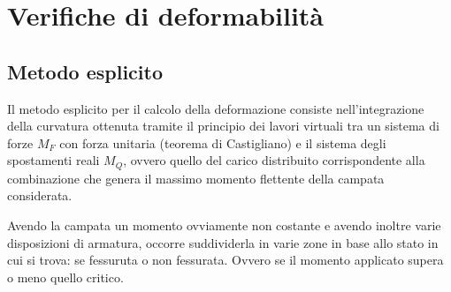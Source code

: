 \section{Verifiche di deformabilità}

\subsection{Metodo esplicito}
Il metodo esplicito per il calcolo della deformazione consiste nell'integrazione della curvatura ottenuta tramite il principio dei lavori virtuali tra un sistema di forze $M_F$ con forza unitaria (teorema di Castigliano) e il sistema degli spostamenti reali $M_Q$, ovvero quello del carico distribuito corrispondente alla combinazione che genera il massimo momento flettente della campata considerata.

Avendo la campata un momento ovviamente non costante e avendo inoltre varie disposizioni di armatura, occorre suddividerla in varie zone in base allo stato in cui si trova: se fessuruta o non fessurata.
Ovvero se il momento applicato supera o meno quello critico.

